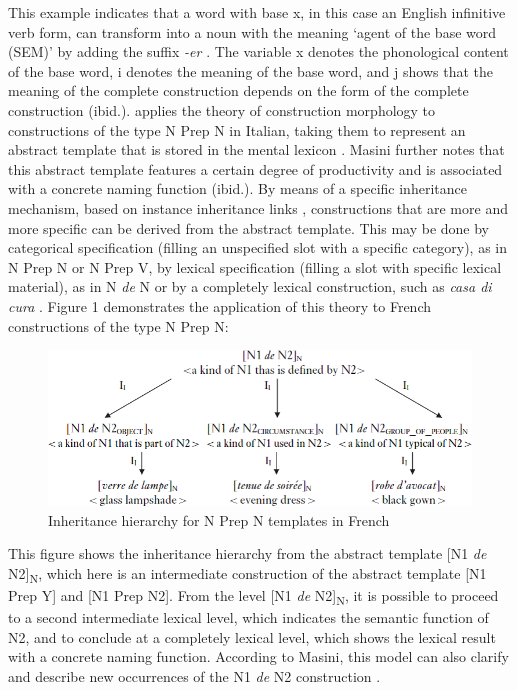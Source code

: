 \documentclass[output=paper]{langsci/langscibook}
\begin{document}
This example indicates that a word with base x, in this case an English infinitive verb form, can transform into a noun with the meaning `agent of the base word (SEM)' by adding the suffix \textit{-er} \citep[2]{Booij:2015}. The variable x denotes the phonological content of the base word, i denotes the meaning of the base word, and j shows that the meaning of the complete construction depends on the form of the complete construction (ibid.). \citet{Masini:2009} applies the theory of construction morphology to constructions of the type N Prep N in Italian, taking them to represent an abstract template that is stored in the mental lexicon \citep[261]{Masini:2009}. Masini further notes that this abstract template features a certain degree of productivity and is associated with a concrete naming function (ibid.). By means of a specific inheritance mechanism, based on instance inheritance links \citep{Goldberg:1995}, constructions that are more and more specific can be derived from the abstract template. This may be done by categorical specification (filling an unspecified slot with a specific category), as in N Prep N or N Prep V, by lexical specification (filling a slot with specific lexical material), as in N \textit{de} N or by a completely lexical construction, such as \textit{casa di cura} \citep[261]{Masini:2009}. Figure 1 demonstrates the application of this theory to French constructions of the type N Prep N: 

\begin{figure}
\caption{Inheritance hierarchy for N Prep N templates in French \citep[263]{Masini:2009} }
\includegraphics[scale=0.5]{figures/Masinifigure2.png} 
\end{figure}

This figure shows the inheritance hierarchy from the abstract template [N1 \textit{de} N2]\textsubscript{N}, which here is an intermediate construction of the abstract template [N1 Prep Y] and [N1 Prep N2]. From the level [N1 \textit{de} N2]\textsubscript{N}, it is possible to proceed to a second intermediate lexical level, which indicates the semantic function of N2, and to conclude at a completely lexical level, which shows the lexical result with a concrete naming function. According to Masini, this model can also clarify and describe new occurrences of the N1 \textit{de} N2 construction \citep[263]{Masini:2009}. 
\end{document}
